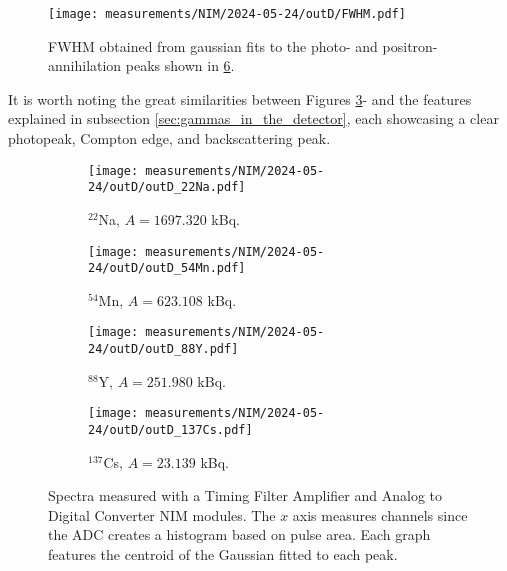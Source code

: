 \begin{figure}[H]
  \centering
  \texttt{[image: measurements/NIM/2024-05-24/outD/FWHM.pdf]}
  \caption{\label{fig:NIM_FWHM}FWHM obtained from gaussian fits to the photo- and positron-annihilation peaks shown in \ref{fig:NIM_spectra}.}
\end{figure}

It is worth noting the great similarities between Figures \ref{sfig:NIM_54Mn}- and the features explained in subsection \ref{sec:gammas_in_the_detector}, each showcasing a clear photopeak, Compton edge, and backscattering peak.

\begin{figure}[H]
  \begin{subfigure}[t]{0.47\textwidth}
    \centering
    \texttt{[image: measurements/NIM/2024-05-24/outD/outD\_22Na.pdf]}
    \caption{\label{sfig:NIM_22Na}$^{22}$Na, $A=1697.320$ kBq.}
  \end{subfigure}
  \hfill
  \begin{subfigure}[t]{0.47\textwidth}
    \centering
    \texttt{[image: measurements/NIM/2024-05-24/outD/outD\_54Mn.pdf]}
    \caption{\label{sfig:NIM_54Mn}$^{54}$Mn, $A=623.108$ kBq.}
  \end{subfigure}
  \medskip
  \begin{subfigure}[t]{0.47\textwidth}
    \centering
    \texttt{[image: measurements/NIM/2024-05-24/outD/outD\_88Y.pdf]}
    \caption{\label{sfig:NIM_88Y}$^{88}$Y, $A=251.980$ kBq.}
  \end{subfigure}
  \hfill
  \begin{subfigure}[t]{0.47\textwidth}
    \centering
    \texttt{[image: measurements/NIM/2024-05-24/outD/outD\_137Cs.pdf]}
    \caption{\label{sfig:NIM_137Cs}$^{137}$Cs, $A=23.139$ kBq.}
  \end{subfigure}
  \caption{\label{fig:NIM_spectra}Spectra measured with a Timing Filter Amplifier and Analog to Digital Converter NIM modules. The $x$ axis measures channels since the ADC creates a histogram based on pulse area. Each graph features the centroid of the Gaussian fitted to each peak.}
\end{figure}

